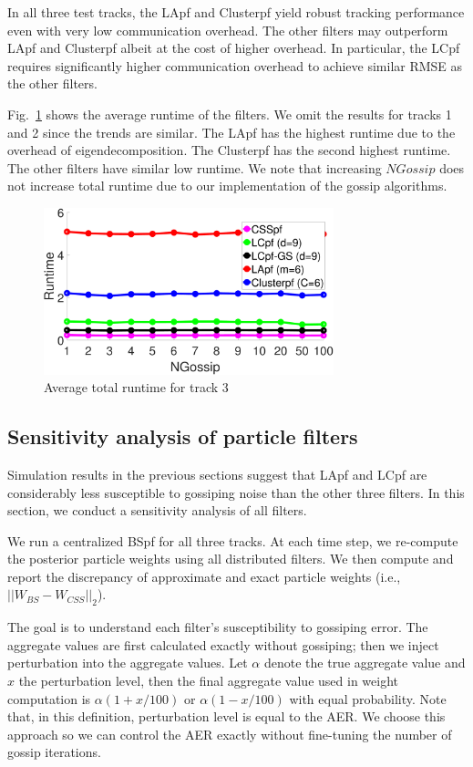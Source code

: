 \documentclass[10pt,letterpaper,final]{article}
\begin{document}
In all three test tracks, the LApf and Clusterpf yield robust tracking performance even with very low communication overhead. The other filters may outperform LApf and Clusterpf albeit at the cost of higher overhead. In particular, the LCpf requires significantly higher communication overhead to achieve similar RMSE as the other filters. 

Fig.~\ref{fig:Track3_time} shows the average runtime of the filters. We omit the results for tracks 1 and 2 since the trends are similar. The LApf has the highest runtime due to the overhead of eigendecomposition. The Clusterpf has the second highest runtime. The other filters have similar low runtime. We note that increasing $NGossip$ does not increase total runtime due to our implementation of the gossip algorithms. 

\begin{figure}
\centering
\includegraphics[width=0.75\textwidth]{Figures/Track3_bearing_time}
\caption{Average total runtime for track 3}
\label{fig:Track3_time}
\end{figure}

\subsection{Sensitivity analysis of particle filters}
Simulation results in the previous sections suggest that LApf and LCpf are considerably less susceptible to gossiping noise than the other three filters. In this section, we conduct a sensitivity analysis of all filters.

We run a centralized BSpf for all three tracks. At each time step, we re-compute the posterior particle weights using all distributed filters. We then compute and report the discrepancy of approximate and exact particle weights (i.e., $||W_{BS}-W_{CSS}||_2$).

The goal is to understand each filter's susceptibility to gossiping error. The aggregate values are first calculated exactly without gossiping; then we inject perturbation into the aggregate values. Let $\alpha$ denote the true aggregate value and $x$ the perturbation level, then the final aggregate value used in weight computation is $\alpha(1+ x/100)$ or $\alpha(1- x/100)$ with equal probability. Note that, in this definition, perturbation level is equal to the AER. We choose this approach so we can control the AER exactly without fine-tuning the number of gossip iterations. 
\end{document}
